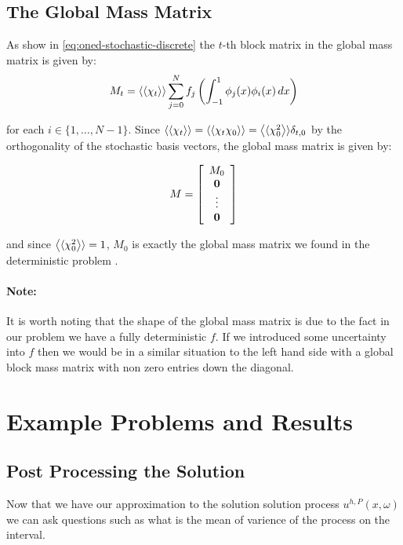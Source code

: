 \subsection{The Global Mass Matrix}

As show in \ref{eq:oned-stochastic-discrete} the $t$-th block matrix in the
global mass matrix is given by:
\begin{equation}
    M_t = \left\langle\langle\chi_t\right\rangle\rangle\sum_{j=0}^Nf_j\left(
        \int_{-1}^1\phi_j(x)\phi_i(x)\, dx\right)
\end{equation}

for each $i \in \{1,\ldots,N-1\}$. Since $\left\langle\langle\chi_t\right\rangle\rangle =
\left\langle\langle\chi_t\chi_0\right\rangle\rangle = \left\langle\langle\chi_0^2\right\rangle\rangle\delta_{t, 0}$ by the orthogonality of
the stochastic basis vectors, the global mass matrix is given by:

\begin{equation}
    M = \left[\begin{array}{c}
        M_0 \\ \mathbf{0} \\ \vdots \\ \mathbf{0}
    \end{array}\right]
\end{equation}

and since $\left\langle\langle\chi_0^2\right\rangle\rangle = 1$, $M_0$ is exactly the global mass matrix we
found in the deterministic problem .

\paragraph{Note:}

It is worth noting that the shape of the global mass matrix is due to the fact
in our problem we have a fully deterministic $f$. If we introduced some
uncertainty into $f$ then we would be in a similar situation to the left hand
side with a global block mass matrix with non zero entries down the diagonal.

\section{Example Problems and Results}


\subsection{Post Processing the Solution}

Now that we have our approximation to the solution solution process
$u^{h,P}(x,\omega)$ we can ask questions such as what is the mean of varience
of the process on the interval.

